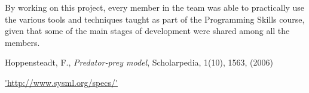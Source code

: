 \documentclass[12pt,a4paper]{article}
\begin{document}
By working on this project, every member in the team was able to practically use the various tools and techniques taught as part of the Programming Skills course, given that some of the main stages of development were shared among all the members.
 




\begin{thebibliography}{100}


 Hoppensteadt, F., \emph{Predator-prey model}, Scholarpedia, 1(10), 1563, (2006)

 \url{'http://www.sysml.org/specs/'}


\end{thebibliography}
\end{document}
